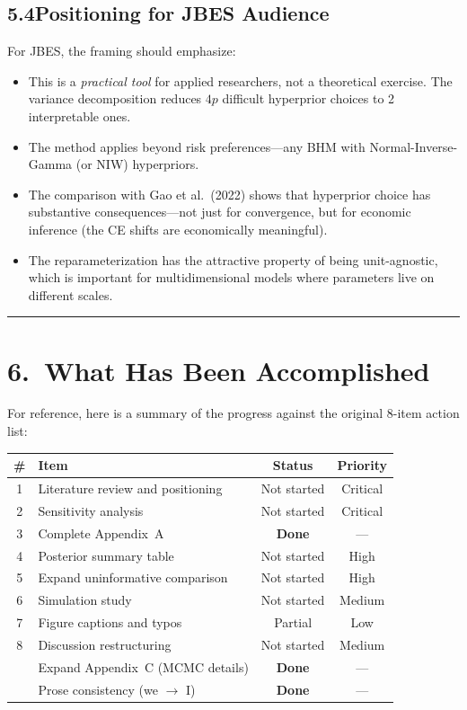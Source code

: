 \documentclass[12pt,a4paper]{article}
\begin{document}
\subsection{5.4\quad Positioning for JBES Audience}

For JBES, the framing should emphasize:
\begin{itemize}[leftmargin=1.5em]
\item This is a \emph{practical tool} for applied researchers, not a theoretical
exercise.  The variance decomposition reduces $4p$ difficult hyperprior choices
to 2 interpretable ones.
\item The method applies beyond risk preferences---any BHM with
Normal-Inverse-Gamma (or NIW) hyperpriors.
\item The comparison with Gao et al.\ (2022) shows that hyperprior choice has
substantive consequences---not just for convergence, but for economic inference
(the CE shifts are economically meaningful).
\item The reparameterization has the attractive property of being unit-agnostic,
which is important for multidimensional models where parameters live on
different scales.
\end{itemize}

\vspace{0.5em}
\hrule
\vspace{0.5em}

\section{6.\ What Has Been Accomplished}

For reference, here is a summary of the progress against the original 8-item
action list:

\begin{center}
\small
\begin{tabular}{@{}clcc@{}}
\toprule
\textbf{\#} & \textbf{Item} & \textbf{Status} & \textbf{Priority} \\
\midrule
1 & Literature review and positioning & Not started & Critical \\
2 & Sensitivity analysis & Not started & Critical \\
3 & Complete Appendix~A & \textbf{Done} & --- \\
4 & Posterior summary table & Not started & High \\
5 & Expand uninformative comparison & Not started & High \\
6 & Simulation study & Not started & Medium \\
7 & Figure captions and typos & Partial & Low \\
8 & Discussion restructuring & Not started & Medium \\
\midrule
  & Expand Appendix~C (MCMC details) & \textbf{Done} & --- \\
  & Prose consistency (we $\to$ I) & \textbf{Done} & --- \\
\bottomrule
\end{tabular}
\end{center}
\end{document}
